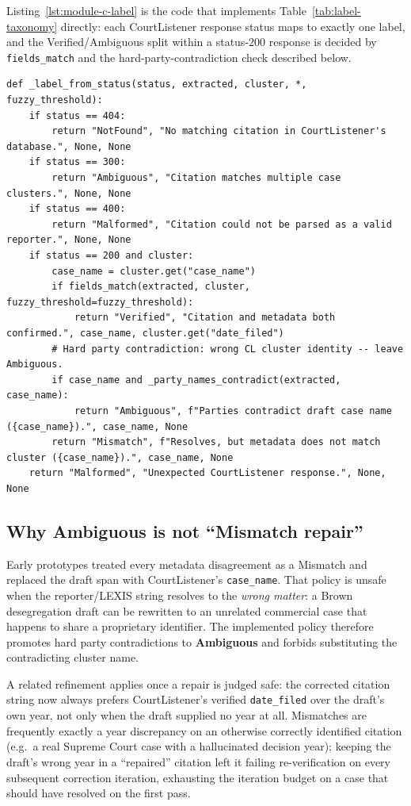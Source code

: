 Listing~\ref{lst:module-c-label} is the code that implements Table~\ref{tab:label-taxonomy} directly: each CourtListener response status maps to exactly one label, and the Verified/Ambiguous split within a status-200 response is decided by \texttt{fields\_match} and the hard-party-contradiction check described below.

\begin{lstlisting}[caption={CourtListener status to taxonomy-label mapping (\href{\repourl/blob/main/src/module_c_verifier/verify.py}{\texttt{src/module\_c\_verifier/verify.py}}).}, label={lst:module-c-label}]
def _label_from_status(status, extracted, cluster, *, fuzzy_threshold):
    if status == 404:
        return "NotFound", "No matching citation in CourtListener's database.", None, None
    if status == 300:
        return "Ambiguous", "Citation matches multiple case clusters.", None, None
    if status == 400:
        return "Malformed", "Citation could not be parsed as a valid reporter.", None, None
    if status == 200 and cluster:
        case_name = cluster.get("case_name")
        if fields_match(extracted, cluster, fuzzy_threshold=fuzzy_threshold):
            return "Verified", "Citation and metadata both confirmed.", case_name, cluster.get("date_filed")
        # Hard party contradiction: wrong CL cluster identity -- leave Ambiguous.
        if case_name and _party_names_contradict(extracted, case_name):
            return "Ambiguous", f"Parties contradict draft case name ({case_name}).", case_name, None
        return "Mismatch", f"Resolves, but metadata does not match cluster ({case_name}).", case_name, None
    return "Malformed", "Unexpected CourtListener response.", None, None
\end{lstlisting}

\subsection{Why Ambiguous is not ``Mismatch repair''}
Early prototypes treated every metadata disagreement as a Mismatch and replaced the draft span with CourtListener's \texttt{case\_name}. That policy is unsafe when the reporter/LEXIS string resolves to the \emph{wrong matter}: a Brown desegregation draft can be rewritten to an unrelated commercial case that happens to share a proprietary identifier. The implemented policy therefore promotes hard party contradictions to \textbf{Ambiguous} and forbids substituting the contradicting cluster name.

A related refinement applies once a repair is judged safe: the corrected citation string now always prefers CourtListener's verified \texttt{date\_filed} over the draft's own year, not only when the draft supplied no year at all. Mismatches are frequently exactly a year discrepancy on an otherwise correctly identified citation (e.g.\ a real Supreme Court case with a hallucinated decision year); keeping the draft's wrong year in a ``repaired'' citation left it failing re-verification on every subsequent correction iteration, exhausting the iteration budget on a case that should have resolved on the first pass.

